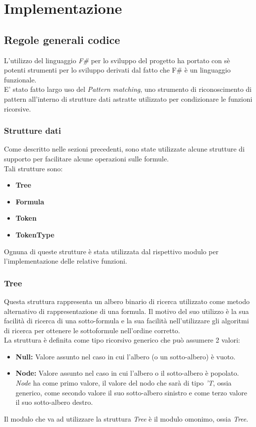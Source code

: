 \documentclass[\main/tesi.tex]{subfiles}
\begin{document}
\chapter{Implementazione}

\section{Regole generali codice}
L'utilizzo del linguaggio \textit{F\#} \cite{fsharp} per lo sviluppo del progetto ha portato con sè potenti strumenti per lo sviluppo derivati dal fatto che F\# \cite{fsharp} è un linguaggio funzionale. \\
E' stato fatto largo uso del \textit{Pattern matching}, uno strumento di riconoscimento di pattern all'interno di strutture dati astratte utilizzato per condizionare le funzioni ricorsive. \\

\subsection{Strutture dati}
Come descritto nelle sezioni precedenti, sono state utilizzate alcune strutture di supporto per facilitare alcune operazioni sulle formule. \\
Tali strutture sono:
\begin{itemize}
    \item \textbf{Tree}
    \item \textbf{Formula}
    \item \textbf{Token}
    \item \textbf{TokenType}
\end{itemize}
Ognuna di queste strutture è stata utilizzata dal rispettivo modulo per l'implementazione delle relative funzioni.

\subsection{Tree}
Questa struttura rappresenta un albero binario di ricerca utilizzato come metodo alternativo di rappresentazione di una formula. Il motivo del suo utilizzo è la sua facilità di ricerca di una sotto-formula e la sua facilità nell'utilizzare gli algoritmi di ricerca per ottenere le sottoformule nell'ordine corretto. \\
La struttura è definita come tipo ricorsivo generico che può assumere 2 valori:
\begin{itemize}
    \item \textbf{Null:} Valore assunto nel caso in cui l'albero (o un sotto-albero) è vuoto.
    \item \textbf{Node:} Valore assunto nel caso in cui l'albero o il sotto-albero è popolato. \textit{Node} ha come primo valore, il valore del nodo che sarà di tipo \textit{'T}, ossia generico, come secondo valore il suo sotto-albero sinistro e come terzo valore il suo sotto-albero destro.
\end{itemize}
Il modulo che va ad utilizzare la struttura \textit{Tree} è il modulo omonimo, ossia \textit{Tree}.
\end{document}
